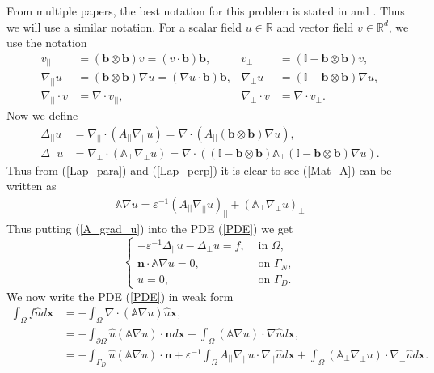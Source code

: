 \documentclass[12pt]{ociamthesis}
\begin{document}
From multiple papers, the best notation for this problem is stated in \cite{DN} and \cite{AP}. Thus we will use a similar notation. For a scalar field $u\in\mathbb{R}$ and vector field $v \in \mathbb{R}^d$, we use the notation
\begin{align}
v_{||} &=(\mathbf{b} \otimes \mathbf{b})v = (v \cdot \mathbf{b})\mathbf{b}
, & v_{\perp} &= (\mathbb{I}-\mathbf{b} \otimes \mathbf{b})v,\\
\nabla_{||}u &= (\mathbf{b} \otimes \mathbf{b}) \nabla u = (\nabla u \cdot \mathbf{b})\mathbf{b},
& \nabla_{\perp} u &= (\mathbb{I}-\mathbf{b} \otimes \mathbf{b}) \nabla u,\\
\nabla_{||} \cdot v &= \nabla \cdot v_{||},
& \nabla_{\perp} \cdot v &= \nabla \cdot v_{\perp}.
\end{align}
Now we define 
\begin{align} \label{Lap_para}
\Delta_{||}u &= \nabla_{||}\cdot(A_{||}\nabla_{||}u)  =
\nabla \cdot(A_{||} (\mathbf{b} \otimes \mathbf{b}) \nabla u),\\ \label{Lap_perp}
\Delta_{\perp}u  &= \nabla_{\perp}\cdot(\mathbb{A}_{\perp}\nabla_{\perp}u)  = 
\nabla \cdot((\mathbb{I}-\mathbf{b} \otimes \mathbf{b})\mathbb{A}_{\perp}(\mathbb{I}-\mathbf{b} \otimes \mathbf{b})\nabla u).
\end{align}
Thus from (\ref{Lap_para}) and (\ref{Lap_perp}) it is clear to see (\ref{Mat_A}) can be written as
\begin{align} \label{A_grad_u}
\mathbb{A} \nabla u = 
\varepsilon^{-1}(A_{||}\nabla_{||} u)_{||} + 
(\mathbb{A}_{\perp}\nabla_{\perp}u)_{\perp} 
\end{align}
Thus putting (\ref{A_grad_u}) into the PDE (\ref{PDE}) we get
\begin{equation}
\begin{cases}
-\varepsilon^{-1} \Delta_{||}u - \Delta_{\perp}u = f, & \text{ in }\Omega,\\
\mathbf{n}\cdot \mathbb{A}\nabla u = 0, & \text{ on }\Gamma_N, \\
u = 0, & \text{  on }\Gamma_D.
\end{cases}
\end{equation}
We now write the PDE (\ref{PDE}) in weak form
\begin{align}
\int_{\Omega}f\hat{u}d\mathbf{x} &= - \int_{\Omega} \nabla \cdot (\mathbb{A} \nabla u) \hat{u} \mathbf{x},\\ \label{WF_ND}
&= - \int_{\partial \Omega} \hat{u} (\mathbb{A} \nabla u) \cdot \mathbf{n} d\mathbf{x}
+ \int_{\Omega}(\mathbb{A}\nabla u)\cdot \nabla \hat{u} d \mathbf{x},\\ \label{Intro_Final_w}
&= - \int_{\Gamma_D} \hat{u} (\mathbb{A}\nabla u) \cdot \mathbf{n} + 
\varepsilon^{-1}\int_{\Omega} A_{||} \nabla_{||}u \cdot \nabla_{||}\hat{u} d\mathbf{x} +
\int_{\Omega}(\mathbb{A}_{\perp} \nabla_{\perp} u )\cdot \nabla_{\perp} \hat{u} d\mathbf{x}.
\end{align}
\end{document}
